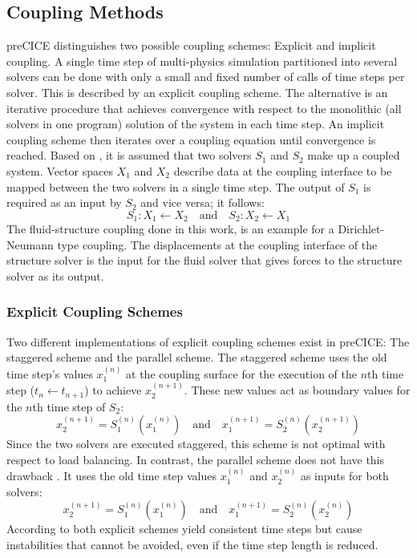  \subsection{Coupling Methods}\label{sec:Coupl-Coupling}
  preCICE distinguishes two possible coupling schemes: Explicit and implicit coupling. A single time step of multi-physics simulation partitioned into several solvers can be done with only a small and fixed number of calls of time steps per solver. This is described by an explicit coupling scheme. The alternative is an iterative procedure that achieves convergence with respect to the monolithic (all solvers in one program) solution of the system in each time step. An implicit coupling scheme then iterates over a coupling equation until convergence is reached. Based on \cite{bungartz2015fully}, it is assumed that two solvers $S_1$ and $S_2$ make up a coupled system. Vector spaces $X_1$ and $X_2$ describe data at the coupling interface to be mapped between the two solvers in a single time step. The output of $S_1$ is required as an input by $S_2$ and vice versa; it follows:
  \begin{equation}
  S_1: X_1 \leftarrow X_2\quad \text{and}\quad S_2:X_2 \leftarrow X_1
  \end{equation}
  The fluid-structure coupling done in this work, is an example for a Dirichlet-Neumann type coupling. The displacements at the coupling interface of the structure solver is the input for the fluid solver that gives forces to the structure solver as its output.
 
  \subsubsection{Explicit Coupling Schemes}\label{sec:Coupl-Coupling-Explicit}
   Two different implementations of explicit coupling schemes exist in preCICE: The staggered scheme and the parallel scheme. The staggered scheme uses the old time step's values $x_1^{(n)}$ at the coupling surface for the execution of the $n$th time step ($t_n \leftarrow t_{n+1}$) to achieve $x_2^{(n+1)}$. These new values act as boundary values for the $n$th time step of $S_2$:
   \begin{equation}
   x_2^{(n+1)} = S_1^{(n)}\left( x_1^{(n)} \right)\quad \text{and}\quad x_1^{(n+1)} = S_2^{(n)}\left( x_2^{(n+1)} \right)
   \end{equation}
   Since the two solvers are executed staggered, this scheme is not optimal with respect to load balancing. In contrast, the parallel scheme does not have this drawback \cite{bungartz2015fully}. It uses the old time step values $x_1^{(n)}$ and $x_2^{(n)}$ as inputs for both solvers:
   \begin{equation}
   x_2^{(n+1)} = S_1^{(n)}\left( x_1^{(n)} \right)\quad \text{and}\quad x_1^{(n+1)} = S_2^{(n)}\left( x_2^{(n)} \right)
   \end{equation}
   According to \cite{bungartz2015fully} both explicit schemes yield consistent time steps but cause instabilities that cannot be avoided, even if the time step length is reduced.
  
